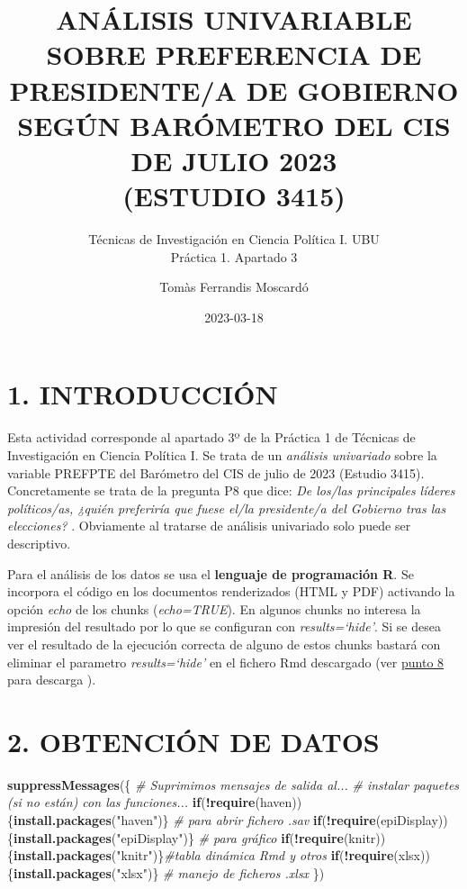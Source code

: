\documentclass[
  12 pt,
  a4paper,
]{article}
\title{ANÁLISIS UNIVARIABLE SOBRE PREFERENCIA DE PRESIDENTE/A DE
GOBIERNO SEGÚN BARÓMETRO DEL CIS DE JULIO 2023\\
(ESTUDIO 3415)}
\subtitle{Técnicas de Investigación en Ciencia Política I. UBU\\
Práctica 1. Apartado 3}
\author{Tomàs Ferrandis Moscardó}
\date{2023-03-18}
\newenvironment{Shaded}{\begin{snugshade}}{\end{snugshade}}
\newcommand{\CommentTok}[1]{\textcolor[rgb]{0.56,0.35,0.01}{\textit{#1}}}
\newcommand{\ControlFlowTok}[1]{\textcolor[rgb]{0.13,0.29,0.53}{\textbf{#1}}}
\newcommand{\FunctionTok}[1]{\textcolor[rgb]{0.13,0.29,0.53}{\textbf{#1}}}
\newcommand{\NormalTok}[1]{#1}
\newcommand{\SpecialCharTok}[1]{\textcolor[rgb]{0.81,0.36,0.00}{\textbf{#1}}}
\newcommand{\StringTok}[1]{\textcolor[rgb]{0.31,0.60,0.02}{#1}}
\begin{document}
\maketitle

{
\setcounter{tocdepth}{2}
\tableofcontents
}
\newpage
\renewcommand\tablename{Tabla}

\hypertarget{introducciuxf3n}{%
\section{1. INTRODUCCIÓN}\label{introducciuxf3n}}

Esta actividad corresponde al apartado 3º de la Práctica 1 de Técnicas
de Investigación en Ciencia Política I. Se trata de un \emph{análisis
univariado} sobre la variable PREFPTE del Barómetro del CIS de julio de
2023 (Estudio 3415). Concretamente se trata de la pregunta P8 que dice:
\emph{De los/las principales líderes políticos/as, ¿quién preferiría que
fuese el/la presidente/a del Gobierno tras las elecciones?} . Obviamente
al tratarse de análisis univariado solo puede ser descriptivo.

Para el análisis de los datos se usa el \textbf{lenguaje de programación
R}. Se incorpora el código en los documentos renderizados (HTML y PDF)
activando la opción \emph{echo} de los chunks (\emph{echo=TRUE}). En
algunos chunks no interesa la impresión del resultado por lo que se
configuran con \emph{results=`hide'}. Si se desea ver el resultado de la
ejecución correcta de alguno de estos chunks bastará con eliminar el
parametro \emph{results=`hide'} en el fichero Rmd descargado (ver
\protect\hyperlink{id-github}{punto 8} para descarga ).

\hypertarget{obtenciuxf3n-de-datos}{%
\section{2. OBTENCIÓN DE DATOS}\label{obtenciuxf3n-de-datos}}

\begin{Shaded}
\begin{Highlighting}[]
\FunctionTok{suppressMessages}\NormalTok{(\{ }\CommentTok{\# Suprimimos mensajes de salida al...}
\CommentTok{\# instalar paquetes (si no están) con las funciones...}
\ControlFlowTok{if}\NormalTok{(}\SpecialCharTok{!}\FunctionTok{require}\NormalTok{(haven))\{}\FunctionTok{install.packages}\NormalTok{(}\StringTok{"haven"}\NormalTok{)\} }\CommentTok{\# para abrir fichero .sav}
\ControlFlowTok{if}\NormalTok{(}\SpecialCharTok{!}\FunctionTok{require}\NormalTok{(epiDisplay))\{}\FunctionTok{install.packages}\NormalTok{(}\StringTok{"epiDisplay"}\NormalTok{)\} }\CommentTok{\# para gráfico }
\ControlFlowTok{if}\NormalTok{(}\SpecialCharTok{!}\FunctionTok{require}\NormalTok{(knitr))\{}\FunctionTok{install.packages}\NormalTok{(}\StringTok{"knitr"}\NormalTok{)\}}\CommentTok{\#tabla dinámica Rmd y otros}
\ControlFlowTok{if}\NormalTok{(}\SpecialCharTok{!}\FunctionTok{require}\NormalTok{(xlsx))\{}\FunctionTok{install.packages}\NormalTok{(}\StringTok{"xlsx"}\NormalTok{)\} }\CommentTok{\# manejo de ficheros .xlsx}
\NormalTok{\})}
\end{Highlighting}
\end{Shaded}
\end{document}
